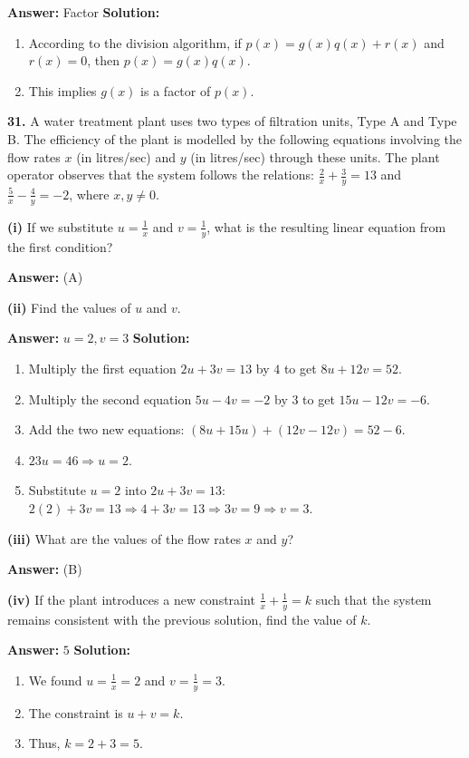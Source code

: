 \documentclass[12pt,a4paper]{exam}
\begin{document}
\begin{questions}
\textbf{Answer:} Factor
\textbf{Solution:}
\begin{enumerate}
  \item According to the division algorithm, if $p(x) = g(x)q(x) + r(x)$ and $r(x) = 0$, then $p(x) = g(x)q(x)$.
  \item This implies $g(x)$ is a factor of $p(x)$.
\end{enumerate}

\vspace{0.3cm}

\question \textbf{31.} A water treatment plant uses two types of filtration units, Type A and Type B. The efficiency of the plant is modelled by the following equations involving the flow rates $x$ (in litres/sec) and $y$ (in litres/sec) through these units. The plant operator observes that the system follows the relations: $\frac{2}{x} + \frac{3}{y} = 13$ and $\frac{5}{x} - \frac{4}{y} = -2$, where $x, y \neq 0$.

\textbf{(i)} If we substitute $u = \frac{1}{x}$ and $v = \frac{1}{y}$, what is the resulting linear equation from the first condition?

\textbf{Answer:} (A)

\textbf{(ii)} Find the values of $u$ and $v$.

\textbf{Answer:} $u = 2, v = 3$
\textbf{Solution:}
\begin{enumerate}
  \item Multiply the first equation $2u + 3v = 13$ by $4$ to get $8u + 12v = 52$.
  \item Multiply the second equation $5u - 4v = -2$ by $3$ to get $15u - 12v = -6$.
  \item Add the two new equations: $(8u + 15u) + (12v - 12v) = 52 - 6$.
  \item $23u = 46 \Rightarrow u = 2$.
  \item Substitute $u=2$ into $2u + 3v = 13$: $2(2) + 3v = 13 \Rightarrow 4 + 3v = 13 \Rightarrow 3v = 9 \Rightarrow v = 3$.
\end{enumerate}

\textbf{(iii)} What are the values of the flow rates $x$ and $y$?

\textbf{Answer:} (B)

\textbf{(iv)} If the plant introduces a new constraint $\frac{1}{x} + \frac{1}{y} = k$ such that the system remains consistent with the previous solution, find the value of $k$.

\textbf{Answer:} $5$
\textbf{Solution:}
\begin{enumerate}
  \item We found $u = \frac{1}{x} = 2$ and $v = \frac{1}{y} = 3$.
  \item The constraint is $u + v = k$.
  \item Thus, $k = 2 + 3 = 5$.
\end{enumerate}


\end{questions}
\end{document}
